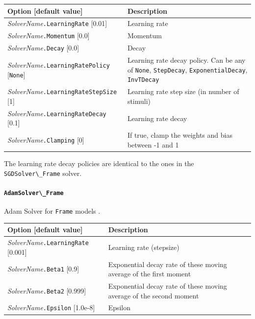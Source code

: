 \documentclass[a4paper,11pt,oneside]{article}
\begin{document}
\begin{center}
 \begin{tabular}{| p{5cm} | p{10cm} | }
 \hline
 Option [default value] & Description\\
 \hline\hline
   \emph{SolverName}\lstinline!.LearningRate! [0.01] & Learning rate \\
   \emph{SolverName}\lstinline!.Momentum! [0.0] & Momentum \\
   \emph{SolverName}\lstinline!.Decay! [0.0] & Decay \\
   \emph{SolverName}\lstinline!.LearningRatePolicy! [\lstinline!None!]
   & Learning rate decay policy. Can be any of
    \lstinline!None!, \lstinline!StepDecay!, \lstinline!ExponentialDecay!, \lstinline!InvTDecay! \\
   \emph{SolverName}\lstinline!.LearningRateStepSize! [1] & Learning rate step
   size (in number of stimuli) \\
   \emph{SolverName}\lstinline!.LearningRateDecay! [0.1] & Learning rate
   decay \\
   \emph{SolverName}\lstinline!.Clamping! [0] & If true, clamp the weights and
    bias between -1 and 1 \\
 \hline
\end{tabular}
\end{center}

The learning rate decay policies are identical to the ones in the \lstinline!SGDSolver\_Frame! solver.




\paragraph{\texorpdfstring{%
\lstinline[basicstyle=\ttfamily\bfseries]!AdamSolver\_Frame!}{AdamSolver\_Frame}}
Adam Solver for \lstinline!Frame! models \citep{KingmaB14}.

\begin{center}
 \begin{tabular}{| p{5cm} | p{10cm} | }
 \hline
 Option [default value] & Description\\
 \hline\hline
   \emph{SolverName}\lstinline!.LearningRate! [0.001] & Learning rate (stepsize) \\
   \emph{SolverName}\lstinline!.Beta1! [0.9] & Exponential decay rate of these moving
average of the first moment \\
   \emph{SolverName}\lstinline!.Beta2! [0.999] & Exponential decay rate of these moving
average of the second moment \\
   \emph{SolverName}\lstinline!.Epsilon! [1.0e-8] & Epsilon \\
 \hline
\end{tabular}
\end{center}
\end{document}
